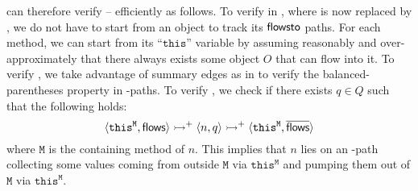  \tool can therefore verify
\selconOne -- \selconThree efficiently as follows. To verify \selconOne in , where \manuLF is now replaced by \LG, 
we do not have to start from an object to track its $\textsf{flowsto}$ paths. 
For each method,
we can start from 
its ``$\texttt{this}$'' variable  by assuming 
 reasonably and over-approximately that there always exists some object $O$ that can 
 flow into it.
 To verify \selconTwo, we take  advantage of summary edges as in
 \cite{lu2021selective} to verify the
 balanced-parentheses property in \LC-paths.
 To verify \selconThree, we check if there exists $ q \in Q$ such that
 the following holds:
\begin{equation}
\label{eq:S-C3}
    \langle \texttt{this}^\mathtt{M}, \textsf{flows}\rangle \rightarrowtail^{+} \langle n, q\rangle \rightarrowtail^{+} \langle \texttt{this}^\mathtt{M}, \overline{\textsf{flows}}\rangle
\end{equation}
where $\mathtt{M}$ is the containing method of $n$. This implies that 
 $n$ lies  on an \LG-path collecting some values coming from outside $\mathtt{M}$ via $\texttt{this}^\mathtt{M}$ 
 and pumping them out of $\mathtt{M}$ via $\texttt{this}^\mathtt{M}$. 



\begin{comment}
\begin{theorem} \label{theorem:flowO}
Let $o$ be an object created in method $m$, then
    $\csabstraction{\texttt{this}^m}{\flows} \transitivetran \csabstraction{o}{\mathcal{O}} \iff
	\csabstraction{o}{\mathcal{O}} \transitivetran \csabstraction{\texttt{this}^m}{\iflows}$.
\end{theorem}

\begin{theorem} \label{theorem:flowV}
Let $v$ be a variable defined in method $m$, then 
    $\csabstraction{\texttt{this}^m}{\flows} \transitivetran \csabstraction{v}{\flows}
    \transitivetran \csabstraction{\texttt{this}^m}{\iflows} \iff$ \linebreak
	$\csabstraction{\texttt{this}^m}{\flows} \transitivetran
	\csabstraction{v}{\iflows} \transitivetran
	\csabstraction{\texttt{this}^m}{\iflows}$.
\end{theorem}
\end{comment}

